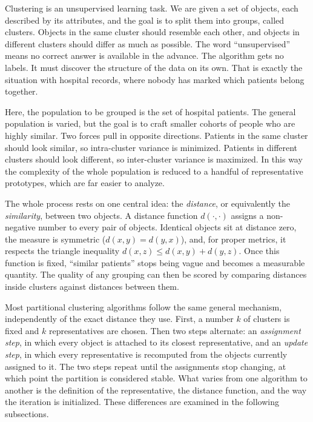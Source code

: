 Clustering is an unsupervised learning task. We are given a set of objects, each described by its attributes, and the goal is to split them into groups, called clusters. Objects in the same cluster should resemble each other, and objects in different clusters should differ as much as possible. The word ``unsupervised'' means no correct answer is available in the advance. The algorithm gets no labels. It must discover the structure of the data on its own. That is exactly the situation with hospital records, where nobody has marked which patients belong together.

Here, the population to be grouped is the set of hospital patients. The general population is varied, but the goal is to craft smaller cohorts of people who are highly similar. Two forces pull in opposite directions. Patients in the same cluster should look similar, so intra-cluster variance is minimized. Patients in different clusters should look different, so inter-cluster variance is maximized. In this way the complexity of the whole population is reduced to a handful of representative prototypes, which are far easier to analyze.

The whole process rests on one central idea: the \emph{distance}, or equivalently the \emph{similarity}, between two objects. A distance function $d(\cdot,\cdot)$ assigns a non-negative number to every pair of objects. Identical objects sit at distance zero, the measure is symmetric ($d(x,y) = d(y,x)$), and, for proper metrics, it respects the triangle inequality $d(x,z) \leq d(x,y) + d(y,z)$. Once this function is fixed, ``similar patients'' stops being vague and becomes a measurable quantity. The quality of any grouping can then be scored by comparing distances inside clusters against distances between them.

Most partitional clustering algorithms follow the same general mechanism, independently of the exact distance they use. First, a number $k$ of clusters is fixed and $k$ representatives are chosen. Then two steps alternate: an \emph{assignment step}, in which every object is attached to its closest representative, and an \emph{update step}, in which every representative is recomputed from the objects currently assigned to it. The two steps repeat until the assignments stop changing, at which point the partition is considered stable. What varies from one algorithm to another is the definition of the representative, the distance function, and the way the iteration is initialized. These differences are examined in the following subsections.

